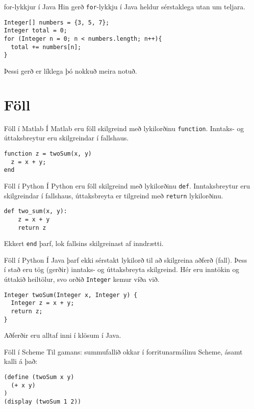\documentclass{beamer}
\begin{document}
\begin{frame}[fragile]{for-lykkjur í Java}
Hin gerð \texttt{for}-lykkju í Java heldur sérstaklega utan um teljara.
\begin{verbatim}
Integer[] numbers = {3, 5, 7};
Integer total = 0;
for (Integer n = 0; n < numbers.length; n++){
  total += numbers[n];
}
\end{verbatim}
Þessi gerð er líklega þó nokkuð meira notuð.
\end{frame}

\section{Föll}

\begin{frame}[fragile]{Föll í Matlab}
Í Matlab eru föll skilgreind með lykilorðinu \texttt{function}. Inntaks- og úttaksbreytur eru skilgreindar í fallshaus.
\begin{verbatim}
function z = twoSum(x, y)
  z = x + y;
end
\end{verbatim}
\end{frame}

\begin{frame}[fragile]{Föll í Python}
Í Python eru föll skilgreind með lykilorðinu \texttt{def}. Inntaksbreytur eru skilgreindar í fallshaus, úttaksbreyta er tilgreind með \texttt{return} lykilorðinu.
\begin{verbatim}
def two_sum(x, y):
    z = x + y
    return z
\end{verbatim}
Ekkert \texttt{end} þarf, lok fallsins skilgreinast af inndrætti.
\end{frame}

\begin{frame}[fragile]{Föll í Python}
Í Java þarf ekki sérstakt lykilorð til að skilgreina aðferð (fall). Þess í stað eru tög (gerðir) inntaks- og úttaksbreyta skilgreind. Hér eru inntökin og úttakið heiltölur, svo orðið \texttt{Integer} kemur víða við.
\begin{verbatim}
Integer twoSum(Integer x, Integer y) {
  Integer z = x + y;
  return z;
}
\end{verbatim}
Aðferðir eru alltaf inni í klösum í Java.
\end{frame}

\begin{frame}[fragile]{Föll í Scheme}
Til gamans: summufallið okkar í forritunarmálinu Scheme, ásamt kalli á það:
\begin{verbatim}
(define (twoSum x y)
  (+ x y)
)
(display (twoSum 1 2))
\end{verbatim}

\end{frame}
\end{document}
